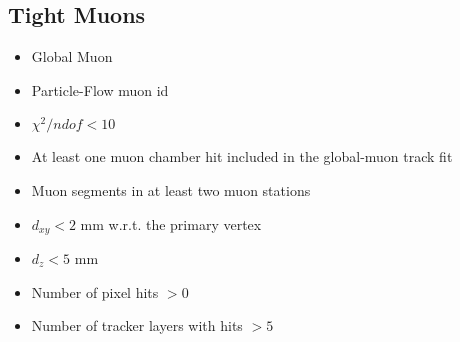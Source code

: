\subsection{Tight Muons}

\begin{itemize}
  \item Global Muon
  \item Particle-Flow muon id 
  \item $\chi^2/ndof < 10$
  \item At least one muon chamber hit included in the global-muon track fit
  \item Muon segments in at least two muon stations
  \item $d_{xy} < 2$ mm w.r.t. the primary vertex
  \item $d_z < 5$ mm
  \item Number of pixel hits $> 0$ 
  \item Number of tracker layers with hits $>5$
\end{itemize}


